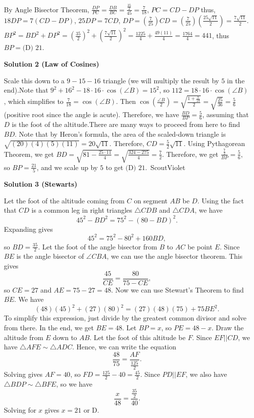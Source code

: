 \begin{enumerate}
 By Angle Bisector Theorem, $\frac{DP}{PC} = \frac{DB}{BC} = \frac{\frac{35}{2}}{45} = \frac{7}{18}$, $PC = CD-DP$ thus, $18DP = 7(CD-DP)$, $25DP = 7CD$, $DP = \left(\frac{7}{25}\right)CD = \left(\frac{7}{25}\right)\left(\frac{25\sqrt{11}}{2}\right) = \frac{7\sqrt{11}}{2}$. $BP^2 = BD^2+DP^2 = \left(\frac{35}{2}\right)^2+\left(\frac{7\sqrt{11}}{2}\right)^2 = \frac{1225}{4}+\frac{49(11)}{4} = \frac{1764}{4} = 441$, thus $BP = \boxed{\text{(D) }21}.$




\textbf{Solution 2 (Law of Cosines)}

Scale this down to a $9-15-16$ triangle (we will multiply the result by $5$ in the end).Note that $9^2+16^2-18\cdot16\cdot\cos(\angle B) = 15^2$, so $112 = 18 \cdot 16 \cdot \cos(\angle B)$, which simplifies to $\frac{7}{18} = \cos(\angle B)$. Then $\cos(\frac{\angle B}{2}) = \sqrt{\frac{1+\frac{7}{18}}{2}} = \sqrt{\frac{25}{36}} = \frac{5}{6}$ (positive root since the angle is acute). Therefore, we have $\frac{BD}{BP} = \frac{5}{6}$, assuming that $D$ is the foot of the altitude.There are many ways to proceed from here to find $BD$. Note that by Heron's formula, the area of the scaled-down triangle is $\sqrt{(20)(4)(5)(11)} = 20\sqrt{11}$. Therefore, $CD = \frac{5}{2}\sqrt{11}$. Using Pythagorean Theorem, we get $BD= \sqrt{81-\frac{25 \cdot 11}{4}} = \sqrt{\frac{324-275}{4}} = \frac{7}{2}$. Therefore, we get $\frac{\frac{7}{2}}{BP} = \frac{5}{6}$, so $BP = \frac{21}{5}$, and we scale up by $5$ to get $\boxed{\text{(D) }21}$.~ScoutViolet

 



\textbf{Solution 3 (Stewarts)}

Let the foot of the altitude coming from $C$ on segment $AB$ be $D$. Using the fact that $CD$ is a common leg in right triangles $\triangle CDB$ and $\triangle CDA$, we have 
 \[45^2 - BD^2 = 75^2 - (80-BD)^2.\] Expanding gives 
 \[45^2=75^2-80^2+160BD,\] so $BD=\frac{35}{2}.$ Let the foot of the angle bisector from $B$ to $AC$ be point $E$. Since $BE$ is the angle bisector of $\angle CBA$, we can use the angle bisector theorem. This gives 
 \[\frac{45}{CE}=\frac{80}{75-CE},\] so $CE=27$ and $AE=75-27=48$. Now we can use Stewart’s Theorem to find $\overline{BE}$. We have 
 \[(48)(45)^2+(27)(80)^2=(27)(48)(75)+75BE^2.\] To simplify this expression, just divide by the greatest common divisor and solve from there. In the end, we get $BE=48$. Let $BP=x$, so $PE=48-x$. Draw the altitude from $E$ down to $AB$. Let the foot of this altitude be $F$. Since $EF || CD$, we have $\triangle AFE \sim \triangle ADC$. Hence, we can write the equation 
 \[\frac{48}{75}=\frac{AF}{\frac{125}{2}}.\] Solving gives $AF=40$, so $FD=\frac{125}{2}-40=\frac{45}{2}$. Since $PD || EF$, we also have $\triangle BDP \sim \triangle BFE$, so we have 
 \[\frac{x}{48}=\frac{\frac{35}{2}}{40}.\] Solving for $x$ gives $\boxed{x=21}$ or $\boxed{\text{D}}.$





\end{enumerate}

